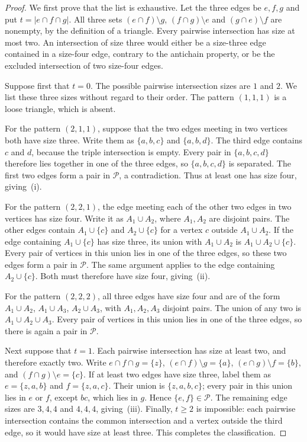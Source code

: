 \documentclass[11pt]{article}
\numberwithin{equation}{section}
\theoremstyle{remark}
\begin{document}
\begin{proof}
We first prove that the list is exhaustive. Let the three edges be $e,f,g$ and put $t=|e\cap f\cap g|$. All three sets $(e\cap f)\setminus g$, $(f\cap g)\setminus e$ and $(g\cap e)\setminus f$ are nonempty, by the definition of a triangle. Every pairwise intersection has size at most two. An intersection of size three would either be a size-three edge contained in a size-four edge, contrary to the antichain property, or be the excluded intersection of two size-four edges.

Suppose first that $t=0$. The possible pairwise intersection sizes are $1$ and $2$. We list these three sizes without regard to their order. The pattern $(1,1,1)$ is a loose triangle, which is absent.

For the pattern $(2,1,1)$, suppose that the two edges meeting in two vertices both have size three. Write them as $\{a,b,c\}$ and $\{a,b,d\}$. The third edge contains $c$ and $d$, because the triple intersection is empty. Every pair in $\{a,b,c,d\}$ therefore lies together in one of the three edges, so $\{a,b,c,d\}$ is separated. The first two edges form a pair in $\mathcal P$, a contradiction. Thus at least one has size four, giving~\textup{(i)}.

For the pattern $(2,2,1)$, the edge meeting each of the other two edges in two vertices has size four. Write it as $A_1\cup A_2$, where $A_1,A_2$ are disjoint pairs. The other edges contain $A_1\cup\{c\}$ and $A_2\cup\{c\}$ for a vertex $c$ outside $A_1\cup A_2$. If the edge containing $A_1\cup\{c\}$ has size three, its union with $A_1\cup A_2$ is $A_1\cup A_2\cup\{c\}$. Every pair of vertices in this union lies in one of the three edges, so these two edges form a pair in $\mathcal P$. The same argument applies to the edge containing $A_2\cup\{c\}$. Both must therefore have size four, giving~\textup{(ii)}.

For the pattern $(2,2,2)$, all three edges have size four and are of the form $A_1\cup A_2$, $A_1\cup A_3$, $A_2\cup A_3$, with $A_1,A_2,A_3$ disjoint pairs. The union of any two is $A_1\cup A_2\cup A_3$. Every pair of vertices in this union lies in one of the three edges, so there is again a pair in $\mathcal P$.

Next suppose that $t=1$. Each pairwise intersection has size at least two, and therefore exactly two. Write $e\cap f\cap g=\{z\}$, $(e\cap f)\setminus g=\{a\}$, $(e\cap g)\setminus f=\{b\}$, and $(f\cap g)\setminus e=\{c\}$. If at least two edges have size three, label them as $e=\{z,a,b\}$ and $f=\{z,a,c\}$. Their union is $\{z,a,b,c\}$; every pair in this union lies in $e$ or $f$, except $bc$, which lies in $g$. Hence $\{e,f\}\in\mathcal P$. The remaining edge sizes are $3,4,4$ and $4,4,4$, giving~\textup{(iii)}. Finally, $t\ge2$ is impossible: each pairwise intersection contains the common intersection and a vertex outside the third edge, so it would have size at least three. This completes the classification.


\end{proof}
\end{document}
